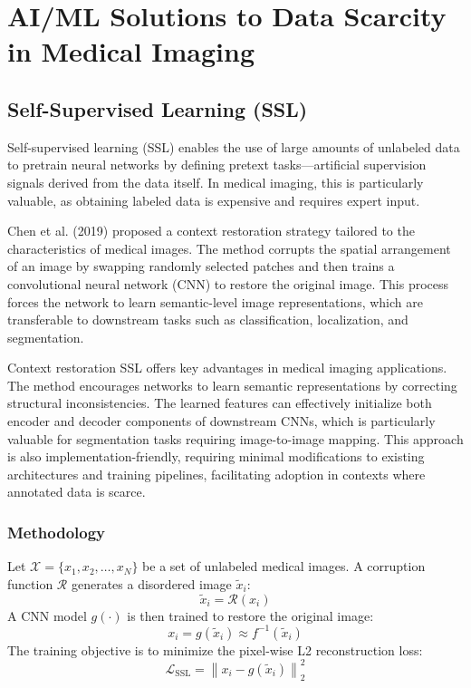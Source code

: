 \documentclass{article}
\begin{document}
\section{AI/ML Solutions to Data Scarcity in Medical Imaging}
\label{sec:ml_technologies}

\subsection{Self-Supervised Learning (SSL)}

Self-supervised learning (SSL) enables the use of large amounts of unlabeled data to pretrain neural networks by defining pretext tasks—artificial supervision signals derived from the data itself. In medical imaging, this is particularly valuable, as obtaining labeled data is expensive and requires expert input​.

Chen et al. (2019)\cite{chenSelfsupervisedLearningMedical2019} proposed a context restoration strategy tailored to the characteristics of medical images. The method corrupts the spatial arrangement of an image by swapping randomly selected patches and then trains a convolutional neural network (CNN) to restore the original image. This process forces the network to learn semantic-level image representations, which are transferable to downstream tasks such as classification, localization, and segmentation​.

Context restoration SSL offers key advantages in medical imaging applications. The method encourages networks to learn semantic representations by correcting structural inconsistencies. The learned features can effectively initialize both encoder and decoder components of downstream CNNs, which is particularly valuable for segmentation tasks requiring image-to-image mapping. This approach is also implementation-friendly, requiring minimal modifications to existing architectures and training pipelines, facilitating adoption in contexts where annotated data is scarce.

\subsubsection{Methodology}
Let $\mathcal{X} = \{x_1, x_2, \ldots, x_N\}$ be a set of unlabeled medical images. A corruption function $\mathcal{R}$ generates a disordered image $\tilde{x}_i$:
\[
\tilde{x}_i = \mathcal{R}(x_i)
\]
A CNN model $g(\cdot)$ is then trained to restore the original image:
\[
x_i = g(\tilde{x}_i) \approx f^{-1}(\tilde{x}_i)
\]
The training objective is to minimize the pixel-wise L2 reconstruction loss:
\[
\mathcal{L}_{\text{SSL}} = \left\| x_i - g(\tilde{x}_i) \right\|_2^2
\]
\end{document}
